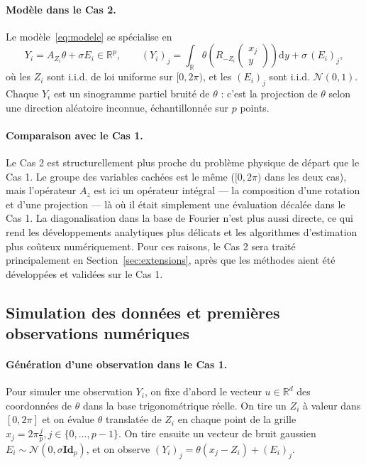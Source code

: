 \documentclass[12pt, a4paper]{article}
\theoremstyle{definition}
\newcommand{\R}{\mathbb{R}}
\newcommand{\Ncal}{\mathcal{N}}
\begin{document}
\paragraph{Modèle dans le Cas 2.}
Le modèle~\eqref{eq:modele} se spécialise en
\[
    Y_i = A_{Z_i}\theta + \sigma E_i \in \R^p, \qquad
    (Y_i)_j = \int_{\R} \theta\!\left(R_{-Z_i}\begin{pmatrix}x_j\\y\end{pmatrix}\right)
    \mathrm{d}y + \sigma\,(E_i)_j,
\]
où les $Z_i$ sont i.i.d. de loi uniforme sur $[0, 2\pi)$, et les $(E_i)_j$ sont
i.i.d. $\Ncal(0,1)$. Chaque $Y_i$ est un sinogramme partiel bruité de $\theta$ :
c'est la projection de $\theta$ selon une direction aléatoire inconnue,
échantillonnée sur $p$ points.

\paragraph{Comparaison avec le Cas 1.}
Le Cas 2 est structurellement plus proche du problème physique de départ que
le Cas 1. Le groupe des variables cachées est le même ($[0, 2\pi)$ dans les deux
cas), mais l'opérateur $A_z$ est ici un opérateur intégral --- la composition
d'une rotation et d'une projection --- là où il était simplement une évaluation
décalée dans le Cas 1. La diagonalisation dans la base de Fourier n'est plus
aussi directe, ce qui rend les développements analytiques plus délicats et les
algorithmes d'estimation plus coûteux numériquement. Pour ces raisons, le Cas 2
sera traité principalement en Section~\ref{sec:extensions}, après que les méthodes
aient été développées et validées sur le Cas 1.

\subsection{Simulation des données et premières observations numériques}
\label{subsec:simulation}
\paragraph{Génération d'une observation dans le Cas 1.}
Pour simuler une observation $Y_i$, on fixe d'abord le vecteur $u \in \mathbb{R}^d$ des 
coordonnées de $\theta$ dans la base trigonométrique réelle. 
On tire un $Z_i$ à valeur dans $[0, 2 \pi]$ et on évalue $\theta$ translatée de $Z_i$ en chaque point de 
la grille $x_j = 2 \pi \frac{j}{p}, j \in \{0,\dots, p-1\}$.
On tire ensuite un vecteur de bruit gaussien $E_i \sim \mathcal{N}(0, \sigma \mathbf{Id}_p)$,
et on observe $(Y_i)_j = \theta(x_j - Z_i) + (E_i)_j$.
\end{document}
